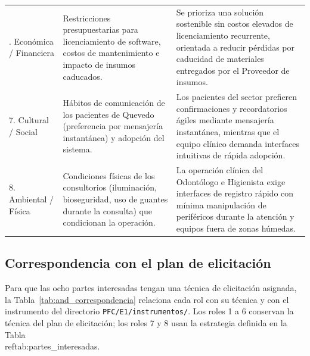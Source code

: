 \documentclass[12pt,a4paper]{article}
\begin{document}
\begin{table}[htbp]
\begin{tabularx}{\textwidth}{
>{\raggedright\arraybackslash}p{2.25cm}
>{\raggedright\arraybackslash}X
>{\raggedright\arraybackslash}X}
6. Económica / Financiera &
Restricciones presupuestarias para licenciamiento de software, costos de mantenimiento e impacto de insumos caducados. &
Se prioriza una solución sostenible sin costos elevados de licenciamiento recurrente, orientada a reducir pérdidas por caducidad de materiales entregados por el Proveedor de insumos.\\
\addlinespace

7. Cultural / Social &
Hábitos de comunicación de los pacientes de Quevedo (preferencia por mensajería instantánea) y adopción del sistema. &
Los pacientes del sector prefieren confirmaciones y recordatorios ágiles mediante mensajería instantánea, mientras que el equipo clínico demanda interfaces intuitivas de rápida adopción.\\
\addlinespace

8. Ambiental / Física &
Condiciones físicas de los consultorios (iluminación, bioseguridad, uso de guantes durante la consulta) que condicionan la operación. &
La operación clínica del Odontólogo e Higienista exige interfaces de registro rápido con mínima manipulación de periféricos durante la atención y equipos fuera de zonas húmedas.\\
\bottomrule
\end{tabularx}
\endgroup
\end{table}




\subsection{Correspondencia con el plan de elicitaci{\'o}n}

Para que las ocho partes interesadas tengan una t{\'e}cnica de elicitaci{\'o}n asignada, la Tabla~\ref{tab:and_correspondencia} relaciona cada rol con su t{\'e}cnica y con el instrumento del directorio \texttt{PFC/E1/instrumentos/}. Los roles 1 a 6 conservan la t{\'e}cnica del plan de elicitaci{\'o}n; los roles 7 y 8 usan la estrategia definida en la Tabla~\\ref{tab:partes_interesadas}.
\end{document}
